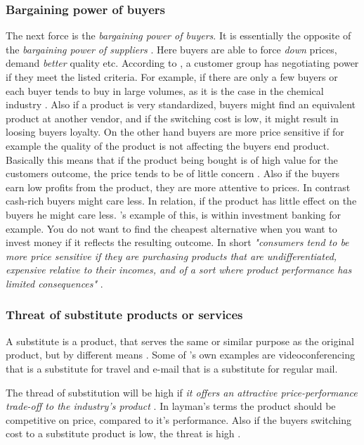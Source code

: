 \subsubsection*{Bargaining power of buyers}
The next force is the \emph{bargaining power of buyers}. It is essentially the opposite of the \emph{bargaining power of suppliers} \cite[p.~83]{porter2008five}. Here buyers are able to force \emph{down} prices, demand \emph{better} quality etc. According to , a customer group has negotiating power if they meet the listed criteria. For example, if there are only a few buyers or each buyer tends to buy in large volumes, as it is the case in the chemical industry \cite[p.~83]{porter2008five}. Also if a product is very standardized, buyers might find an equivalent product at another vendor, and if the switching cost is low, it might result in loosing buyers loyalty. 
On the other hand buyers are more price sensitive if for example the quality of the product is not affecting the buyers end product. Basically this means that if the product being bought is of high value for the customers outcome, the price tends to be of little concern \cite[p.~84]{porter2008five}. Also if the buyers earn low profits from the product, they are more attentive to prices. In contrast cash-rich buyers might care less. In relation, if the product has little effect on the buyers he might care less. 's example of this, is within investment banking for example. You do not want to find the cheapest alternative when you want to invest money if it reflects the resulting outcome. In short \emph{"consumers tend to be more price sensitive if they are purchasing products that are undifferentiated, expensive relative to their incomes, and of a sort where product performance has limited consequences"} \cite[p.~84]{porter2008five}.

\subsubsection*{Threat of substitute products or services}
A substitute is a product, that serves the same or similar purpose as the original product, but by different means \cite[p.~84]{porter2008five}. Some of 's own examples are videoconferencing that is a substitute for travel and e-mail that is a substitute for regular mail. 


The thread of substitution will be high if \emph{it offers an attractive price-performance trade-off to the industry's product} \cite[p.~84]{porter2008five}. In layman's terms the product should be competitive on price, compared to it's performance. Also if the buyers switching cost to a substitute product is low, the threat is high \cite[p.~84]{porter2008five}.

